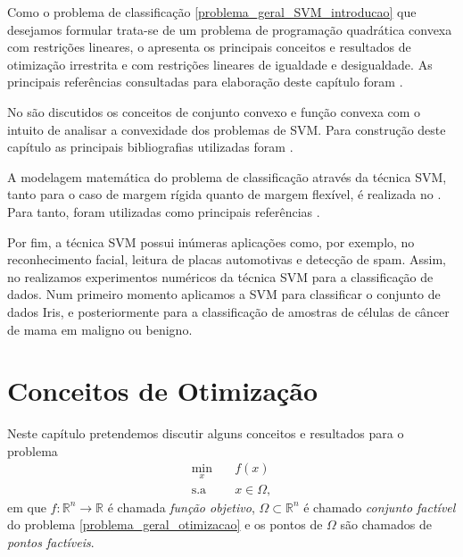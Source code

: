 \documentclass[12pt,a4paper]{scrartcl}
\def\RR{\mathds{R}}
\theoremstyle{definition}%
\begin{document}
Como o problema de classificação \eqref{problema_geral_SVM_introducao} que desejamos formular trata-se de um problema de programação quadrática convexa com restrições lineares, o  apresenta os principais conceitos e resultados de otimização irrestrita e com restrições lineares de igualdade e desigualdade. As principais referências consultadas para elaboração deste capítulo foram \textcite{Ana1994,Ademir2013,Izmailov2014ac,luenberger2008linear}.

No  são discutidos os conceitos de conjunto convexo e função convexa com o intuito de analisar a convexidade dos problemas de SVM. Para construção deste capítulo as principais bibliografias utilizadas foram \textcite{Ademir2013,Izmailov2014ac,luenberger2008linear,bertsekas2016nonlinear}.

A modelagem matemática do problema de classificação através da técnica SVM, tanto para o caso de margem rígida quanto de margem flexível, é realizada no . Para tanto, foram utilizadas como principais referências \textcite{Evelin2017,Faisal2019}.

Por fim, a técnica SVM possui inúmeras aplicações como, por exemplo, no reconhecimento facial, leitura de placas automotivas e detecção de spam. Assim, no  realizamos experimentos numéricos da técnica SVM para a classificação de dados. Num primeiro momento aplicamos a SVM para classificar o conjunto de dados Iris, e posteriormente para a classificação de amostras de células de câncer de mama em maligno ou benigno. 







\newpage
\section{Conceitos de Otimização} \label{chap:conceitos_de_otimizacao}

Neste capítulo pretendemos discutir alguns conceitos e resultados para o problema 
\[ \label{problema_geral_otimizacao}
\begin{aligned}
\min_{x} & \quad f(x) \\
\text{s.a} & \quad x \in \Omega ,
\end{aligned}
\]
em que $f: \RR^{n} \rightarrow \RR$ é chamada \emph{função objetivo}, $\Omega \subset \RR^{n}$ é chamado \emph{conjunto factível} do problema \eqref{problema_geral_otimizacao} e os pontos de $\Omega$ são chamados de \emph{pontos factíveis}. 
\end{document}
